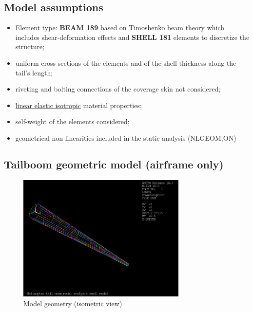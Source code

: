 \clearpage
\subsection*{Model assumptions}

\noindent
\begin{quoting}
	\begin{itemize}
		
		\item Element type: \textbf{BEAM 189} based on Timoshenko beam theory which includes shear-deformation effects and \textbf{SHELL 181} elements to discretize the structure;
		
		\item uniform cross-sections of the elements and of the shell thickness along the tail's length;
		
		\item riveting and bolting connections of the coverage skin not considered;
		
		\item \underline{linear elastic isotropic} material properties;
		
		\item self-weight of the elements considered;
		
		\item geometrical non-linearities included in the static analysis (NLGEOM,ON) \\
		
	\end{itemize}
\end{quoting}

\smallskip
\subsection*{Tailboom geometric model (airframe only)}

\begin{figure}[!htb]
	\centering
	\includegraphics[width=0.75\textwidth]{PICTURES/imgs/ShellModel/img/Shellmodel000.png}
	\caption{Model geometry (isometric view)}
	\label{fig:Geometric}
\end{figure}



